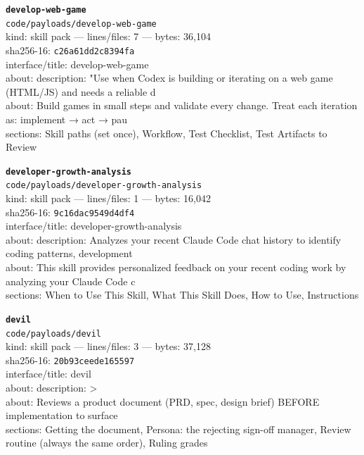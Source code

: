 \noindent\textbf{\texttt{develop-web-game}}\\
\texttt{code/payloads/develop-web-game}\\
kind: skill pack --- lines/files: 7 --- bytes: 36,104\\
sha256-16: \texttt{c26a61dd2c8394fa}\\
interface/title: develop-web-game\\
about: description: "Use when Codex is building or iterating on a web game (HTML/JS) and needs a reliable d\\
about: Build games in small steps and validate every change. Treat each iteration as: implement → act → pau\\
sections: Skill paths (set once), Workflow, Test Checklist, Test Artifacts to Review\\
\vspace*{6.0pt}
\newpage

\noindent\textbf{\texttt{developer-growth-analysis}}\\
\texttt{code/payloads/developer-growth-analysis}\\
kind: skill pack --- lines/files: 1 --- bytes: 16,042\\
sha256-16: \texttt{9c16dac9549d4df4}\\
interface/title: developer-growth-analysis\\
about: description: Analyzes your recent Claude Code chat history to identify coding patterns, development \\
about: This skill provides personalized feedback on your recent coding work by analyzing your Claude Code c\\
sections: When to Use This Skill, What This Skill Does, How to Use, Instructions\\
\vspace*{6.0pt}

\noindent\textbf{\texttt{devil}}\\
\texttt{code/payloads/devil}\\
kind: skill pack --- lines/files: 3 --- bytes: 37,128\\
sha256-16: \texttt{20b93ceede165597}\\
interface/title: devil\\
about: description: >\\
about: Reviews a product document (PRD, spec, design brief) BEFORE implementation to surface\\
sections: Getting the document, Persona: the rejecting sign-off manager, Review routine (always the same order), Ruling grades\\
\vspace*{6.0pt}

